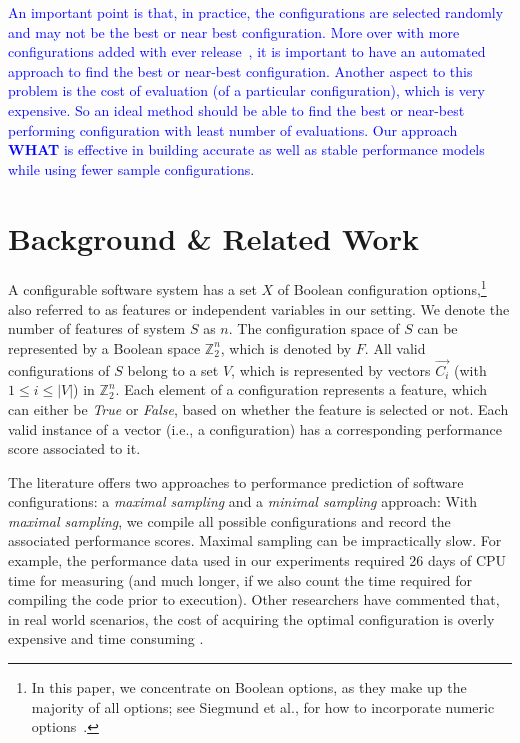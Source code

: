 \documentclass[smallextended]{svjour3}       %
\newcommand{\what}{{\bf WHAT}\xspace}
\begin{document}
\textcolor{blue}{
An important point is that, in practice, the configurations are selected randomly and may not be the best or near best configuration. More over with more configurations added with ever release~\cite{xu2015hey}, it is important to have an automated approach to find the best or near-best configuration. Another aspect to this problem is the cost of evaluation (of a particular configuration), which is very expensive. So an ideal method should be able to find the best or near-best performing configuration with least number of evaluations. Our approach \what{} is effective in building accurate as well as stable performance models while using fewer sample configurations. }
 
\section{Background \& Related Work}  
\label{sect:addit}

A configurable software system has a set $X$ of Boolean configuration options,\footnote{In this paper, we concentrate on Boolean options, as they make up the majority of all options; see Siegmund et al., for how to incorporate numeric options~\cite{SGA+15}.} also referred to as features or independent variables in our setting.
We denote the number of features of system $S$ as $n$. The configuration space of $S$ can be represented by a Boolean space $\mathbb{Z}_{2}^{n}$, which is denoted by $F$. All valid configurations of $S$ belong to a set $V$, 
which is represented by vectors $\vec{C_i}$ (with $1\leq i\leq \left\vert{V}\right\vert$) in $\mathbb{Z}_{2}^{n}$. Each element of a configuration represents a feature, which can either be \emph{True} or \emph{False}, based on whether the feature is selected or not. 
Each valid instance of a vector (i.e., a configuration) has a corresponding performance score associated to it. 

The literature offers two approaches to performance prediction of software configurations: a {\em maximal sampling} and a {\em minimal sampling} approach: 
With {\em maximal sampling}, we compile all  possible configurations and record the associated performance scores. 
Maximal sampling  can be impractically slow. For example, the performance data used in our experiments required  26 days of CPU time for measuring (and much longer, if we also count the time required for compiling the code prior to execution). 
 Other researchers have commented that,  in 
 real world scenarios, the cost of acquiring the optimal configuration is overly expensive and time consuming \cite{weiss2008maximizing}.
 
\end{document}
